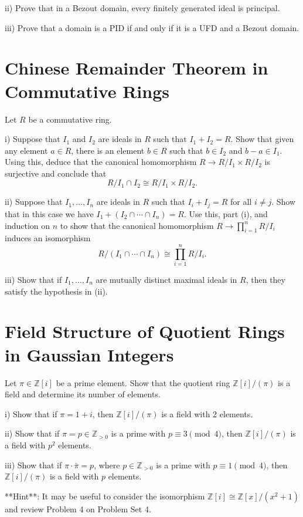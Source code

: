 \documentclass[lang=cn,11pt]{template}
\begin{document}
ii) Prove that in a Bezout domain, every finitely generated ideal is principal.

iii) Prove that a domain is a PID if and only if it is a UFD and a Bezout domain.

\section{Chinese Remainder Theorem in Commutative Rings}
Let \( R \) be a commutative ring.

i) Suppose that \( I_1 \) and \( I_2 \) are ideals in \( R \) such that \( I_1 + I_2 = R \). Show that given any element \( a \in R \), there is an element \( b \in R \) such that \( b \in I_2 \) and \( b - a \in I_1 \). Using this, deduce that the canonical homomorphism \( R \rightarrow R/I_1 \times R/I_2 \) is surjective and conclude that
\[
R/I_1 \cap I_2 \cong R/I_1 \times R/I_2.
\]

ii) Suppose that \( I_1, \ldots, I_n \) are ideals in \( R \) such that \( I_i + I_j = R \) for all \( i \neq j \). Show that in this case we have \( I_1 + (I_2 \cap \cdots \cap I_n) = R \). Use this, part (i), and induction on \( n \) to show that the canonical homomorphism \( R \rightarrow \prod_{i=1}^n R/I_i \) induces an isomorphism
\[
R/(I_1 \cap \cdots \cap I_n) \cong \prod_{i=1}^n R/I_i.
\]

iii) Show that if \( I_1, \ldots, I_n \) are mutually distinct maximal ideals in \( R \), then they satisfy the hypothesis in (ii).

\section{Field Structure of Quotient Rings in Gaussian Integers}
Let \( \pi \in \mathbb{Z}[i] \) be a prime element. Show that the quotient ring \( \mathbb{Z}[i]/(\pi) \) is a field and determine its number of elements.

i) Show that if \( \pi = 1 + i \), then \( \mathbb{Z}[i]/(\pi) \) is a field with 2 elements.

ii) Show that if \( \pi = p \in \mathbb{Z}_{>0} \) is a prime with \( p \equiv 3 \pmod{4} \), then \( \mathbb{Z}[i]/(\pi) \) is a field with \( p^2 \) elements.

iii) Show that if \( \pi \cdot \bar{\pi} = p \), where \( p \in \mathbb{Z}_{>0} \) is a prime with \( p \equiv 1 \pmod{4} \), then \( \mathbb{Z}[i]/(\pi) \) is a field with \( p \) elements.

**Hint**: It may be useful to consider the isomorphism \( \mathbb{Z}[i] \cong \mathbb{Z}[x]/(x^2 + 1) \) and review Problem 4 on Problem Set 4.
\end{document}
